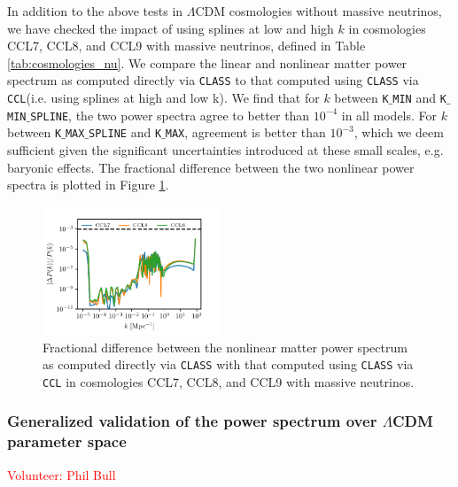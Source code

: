 \documentclass[\docopts]{\docclass}
\newcommand{\vol}[1]{\textcolor{red}{Volunteer: #1}}
\newcommand{\ccl}{{\tt CCL}\xspace}
\begin{document}
In addition to the above tests in $\Lambda$CDM cosmologies without massive neutrinos, we have checked the impact of using splines at low and high $k$ in cosmologies CCL7, CCL8, and CCL9 with massive neutrinos, defined in Table \ref{tab:cosmologies_nu}. We compare the linear and nonlinear matter power spectrum as computed directly via {\tt CLASS} to that computed using {\tt CLASS} via \ccl (i.e. using splines at high and low k). We find that for $k$  between {\tt K$\_$MIN} and {\tt K$\_$MIN$\_$SPLINE}, the two power spectra agree to better than $10^{-4}$ in all models. For $k$ between {\tt K$\_$MAX$\_$SPLINE} and {\tt K$\_$MAX}, agreement is better than $10^{-3}$, which we deem sufficient given the significant uncertainties introduced at these small scales, e.g. baryonic effects. The fractional difference between the two nonlinear power spectra is plotted in Figure \ref{fig:power_nu}. 

\begin{figure}
\centering
\includegraphics[width=0.47\textwidth]{pk_class_nu_NL}
\caption{Fractional difference between the nonlinear matter power spectrum as computed directly via {\tt CLASS} with that computed using {\tt CLASS} via \ccl in cosmologies CCL7, CCL8, and CCL9 with massive neutrinos.}
\label{fig:power_nu}
\end{figure}

\subsubsection{Generalized validation of the power spectrum over $\Lambda$CDM parameter space}
\vol{Phil Bull}
\end{document}
